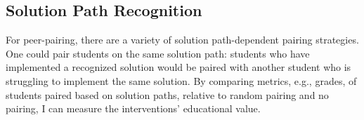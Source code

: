 \documentclass[12pt]{article}
\begin{document}
\subsection{Solution Path Recognition}






For peer-pairing, there are a variety of solution path-dependent pairing strategies. One could pair students on the same solution path: students who have implemented a recognized solution would be paired with another student who is struggling to implement the same solution. By comparing metrics, e.g., grades, of students paired based on solution paths, relative to random pairing and no pairing, I can measure the interventions' educational value.

\end{document}
